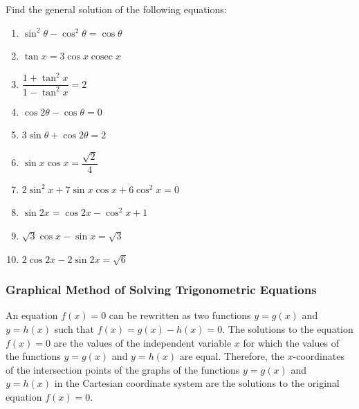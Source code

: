 \documentclass{report}
\begin{document}
Find the general solution of the following equations:
\begin{enumerate}
	\item $\sin ^2 \theta-\cos ^2 \theta=\cos \theta$
	\item $\tan x=3 \cos x \operatorname{cosec} x$
	\item $\dfrac{1+\tan ^2 x}{1-\tan ^2 x}=2$
	\item $\cos 2 \theta-\cos \theta=0$
	\item $3 \sin \theta+\cos 2 \theta=2$
	\item $\sin x \cos x=\dfrac{\sqrt{2}}{4}$
	\item $2 \sin ^2 x+7 \sin x \cos x+6 \cos ^2 x=0$
	\item $\sin 2 x=\cos 2 x-\cos ^2 x+1$
	\item $\sqrt{3} \cos x-\sin x=\sqrt{3}$
	\item $2 \cos 2 x-2 \sin 2 x=\sqrt{6}$
\end{enumerate}

\subsubsection*{Graphical Method of Solving Trigonometric Equations}

An equation $f(x) = 0$ can be rewritten as two functions $y = g(x)$ and $y = h(x)$ such that $f(x) = g(x) - h(x) = 0$. The solutions to the equation $f(x) = 0$ are the values of the independent variable $x$ for which the values of the functions $y = g(x)$ and $y = h(x)$ are equal. Therefore, the $x$-coordinates of the intersection points of the graphs of the functions $y = g(x)$ and $y = h(x)$ in the Cartesian coordinate system are the solutions to the original equation $f(x) = 0$.
\end{document}
